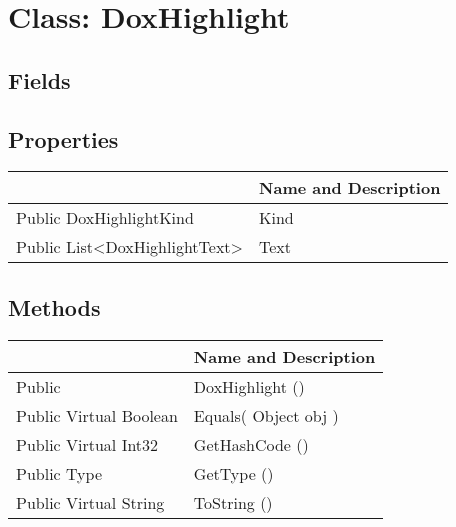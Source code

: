 \documentclass[11pt, oneside, a4paper]{book}
\begin{document}
\hypertarget{SoftwareEngineeringTools.{}Documentation.{}DoxHighlight}{}
\section{Class: DoxHighlight}

\subsection{Fields}

\subsection{Properties}
\begin{center}
\begin{tabular}{| p{3cm} | p{12cm} | }
\hline
\textbf{ } & \textbf{ Name and Description}\\
\hline
 Public  DoxHighlightKind &  Kind\hypertarget{SoftwareEngineeringTools.{}Documentation.{}DoxHighlight.{}Kind}{}\\
\hline
 Public  List<DoxHighlightText> &  Text\hypertarget{SoftwareEngineeringTools.{}Documentation.{}DoxHighlight.{}Text}{}\\
\hline
\end{tabular}
\end{center}

\subsection{Methods}
\begin{center}
\begin{tabular}{| p{3cm} | p{12cm} | }
\hline
\textbf{ } & \textbf{ Name and Description}\\
\hline
 Public  &  DoxHighlight ()\hypertarget{SoftwareEngineeringTools.{}Documentation.{}DoxHighlight.{}DoxHighlight}{}\\
\hline
 Public  Virtual  Boolean &  Equals(\hypertarget{SoftwareEngineeringTools.{}Documentation.{}DoxHighlight.{}Equals\_Object}{} Object  obj  )\\
\hline
 Public  Virtual  Int32 &  GetHashCode ()\hypertarget{SoftwareEngineeringTools.{}Documentation.{}DoxHighlight.{}GetHashCode}{}\\
\hline
 Public  Type &  GetType ()\hypertarget{SoftwareEngineeringTools.{}Documentation.{}DoxHighlight.{}GetType}{}\\
\hline
 Public  Virtual  String &  ToString ()\hypertarget{SoftwareEngineeringTools.{}Documentation.{}DoxHighlight.{}ToString}{}\\
\hline
\end{tabular}
\end{center}
 
\end{document}
